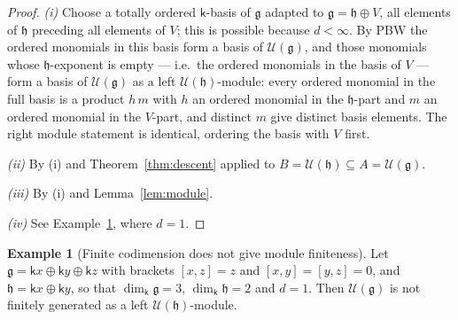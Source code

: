 \documentclass[11pt]{ctexart}
\theoremstyle{plain}
\theoremstyle{definition}
\newtheorem{example}[theorem]{Example}
\theoremstyle{remark}
\newcommand{\kk}{\mathsf{k}}
\newcommand{\gl}{\mathfrak{g}}
\newcommand{\hl}{\mathfrak{h}}
\newcommand{\UU}{\mathcal{U}}
\begin{document}
\begin{proof}
\emph{(i)} Choose a totally ordered $\kk$-basis of $\gl$ adapted to
$\gl=\hl\oplus V$, all elements of $\hl$ preceding all elements of $V$; this is
possible because $d<\infty$. By PBW the ordered monomials in this basis form a basis
of $\UU(\gl)$, and those monomials whose $\hl$-exponent is empty --- i.e.\ the ordered
monomials in the basis of $V$ --- form a basis of $\UU(\gl)$ as a left
$\UU(\hl)$-module: every ordered monomial in the full basis is a product
$h\,m$ with $h$ an ordered monomial in the $\hl$-part and $m$ an ordered monomial in
the $V$-part, and distinct $m$ give distinct basis elements. The right module
statement is identical, ordering the basis with $V$ first.

\emph{(ii)} By (i) and Theorem~\ref{thm:descent} applied to
$B=\UU(\hl)\subseteq A=\UU(\gl)$.

\emph{(iii)} By (i) and Lemma~\ref{lem:module}.

\emph{(iv)} See Example~\ref{ex:nomodule}, where $d=1$.
\end{proof}

\begin{example}[Finite codimension does not give module finiteness]\label{ex:nomodule}
Let $\gl=\kk x\oplus\kk y\oplus\kk z$ with brackets $[x,z]=z$ and $[x,y]=[y,z]=0$,
and $\hl=\kk x\oplus\kk y$, so that $\dim_\kk\gl=3$, $\dim_\kk\hl=2$ and $d=1$. Then
$\UU(\gl)$ is not finitely generated as a left $\UU(\hl)$-module.
\end{example}
\end{document}
